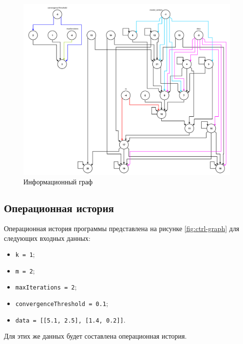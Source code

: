 \begin{figure}[H]
    \centering
    \includegraphics[width=1.0\textwidth, pages=-]{images/info_graph.pdf}
    \caption{Информационный граф}
    \label{fig:info-graph}
\end{figure}

\subsection{Операционная история}

Операционная история программы представлена на рисунке \ref{fig:ctrl-graph} для следующих входных данных:
\begin{itemize}
    \item \texttt{k = 1};
    \item \texttt{m = 2};
    \item \texttt{maxIterations = 2};
    \item \texttt{convergenceThreshold = 0.1};
    \item \texttt{data = [[5.1, 2.5], [1.4, 0.2]]}.
\end{itemize}
Для этих же данных будет составлена операционная история.

